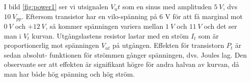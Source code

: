 I bild \ref{fig:power1} ser vi utsignalen \(V_ut\) som en sinus med amplituden
\(5\ V\), dvs \(10\ V_{pp}\). Eftersom transistor har en vilo-spänning på 6 V
för att få marginal mot \(0\ V\) och \(+12\ V\), så kommer spänningen variera
mellan \(1\ V\) och \(11\ V\) och det ser man i \(V_t\) kurvan. Utgångslastens
resistor lastar med en ström \(I_t\) som är proportionerlig mot spänningen
\(V_{ut}\) på utgången. Effekten för transistorn \(P_t\) är sedan absolut-
funktionen för strömmen gånger spänningen, dvs. Joules lag. Den observante ser
att effekten är signifikant högre för andra halvan av kurvan, då man har både
hög spänning och hög ström.
